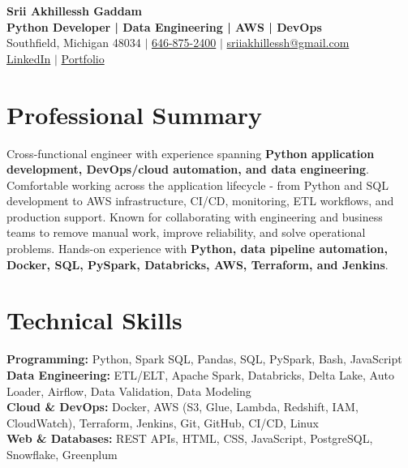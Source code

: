 \documentclass[letterpaper,10pt]{article}
\begin{document}
\fontsize{9.35pt}{10.45pt}\selectfont

\begin{center}
    {\LARGE \textbf{Srii Akhillessh Gaddam}} \\[-1pt]
    \textbf{Python Developer | Data Engineering | AWS | DevOps} \\[2pt]
    Southfield, Michigan 48034 $|$
    \href{tel:6468752400}{646-875-2400} $|$
    \href{mailto:sriiakhillessh@gmail.com}{sriiakhillessh@gmail.com} \\[1pt]
    \href{https://www.linkedin.com/in/srii-akhiilessh-gaddam-b48668191/}{LinkedIn} $|$
    \href{https://sriiakhillesshg.github.io/portfolio/}{Portfolio}
\end{center}
\vspace{-8pt}

\section{Professional Summary}
\small{Cross-functional engineer with experience spanning \textbf{Python application development, DevOps/cloud automation, and data engineering}. Comfortable working across the application lifecycle - from Python and SQL development to AWS infrastructure, CI/CD, monitoring, ETL workflows, and production support. Known for collaborating with engineering and business teams to remove manual work, improve reliability, and solve operational problems. Hands-on experience with \textbf{Python, data pipeline automation, Docker, SQL, PySpark, Databricks, AWS, Terraform, and Jenkins}.}

\section{Technical Skills}
\small{
\textbf{Programming:} Python, Spark SQL, Pandas, SQL, PySpark, Bash, JavaScript \\
\textbf{Data Engineering:} ETL/ELT, Apache Spark, Databricks, Delta Lake, Auto Loader, Airflow, Data Validation, Data Modeling \\
\textbf{Cloud \& DevOps:} Docker, AWS (S3, Glue, Lambda, Redshift, IAM, CloudWatch), Terraform, Jenkins, Git, GitHub, CI/CD, Linux \\
\textbf{Web \& Databases:} REST APIs, HTML, CSS, JavaScript, PostgreSQL, Snowflake, Greenplum
}
\end{document}
